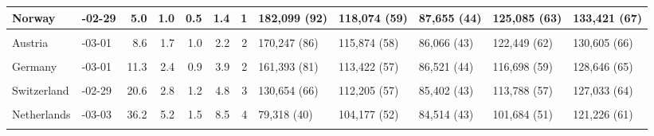 \documentclass[
]{article}
\begin{document}
\begin{landscape}
\begin{table}[H]
{\begin{tabular}[t]{l|>{\raggedright\arraybackslash}p{5em}|r|r|r|r|r|l|l|l|l|l}
\hline
Norway & 2020-02-29 & 5.0 & 1.0 & 0.5 & 1.4 & 1 & 182,099 (92) & 118,074 (59) & 87,655 (44) & 125,085 (63) & 133,421 (67)\\
\hline
\cellcolor{gray!6}{Finland} & \cellcolor{gray!6}{2020-03-02} & \cellcolor{gray!6}{6.1} & \cellcolor{gray!6}{1.4} & \cellcolor{gray!6}{0.3} & \cellcolor{gray!6}{2.4} & \cellcolor{gray!6}{1} & \cellcolor{gray!6}{178,373 (90)} & \cellcolor{gray!6}{116,698 (59)} & \cellcolor{gray!6}{88,432 (45)} & \cellcolor{gray!6}{121,723 (61)} & \cellcolor{gray!6}{133,734 (67)}\\
\hline
Austria & 2020-03-01 & 8.6 & 1.7 & 1.0 & 2.2 & 2 & 170,247 (86) & 115,874 (58) & 86,066 (43) & 122,449 (62) & 130,605 (66)\\
\hline
\cellcolor{gray!6}{Denmark} & \cellcolor{gray!6}{2020-03-04} & \cellcolor{gray!6}{10.9} & \cellcolor{gray!6}{2.1} & \cellcolor{gray!6}{0.8} & \cellcolor{gray!6}{3.0} & \cellcolor{gray!6}{2} & \cellcolor{gray!6}{162,600 (82)} & \cellcolor{gray!6}{114,438 (58)} & \cellcolor{gray!6}{86,669 (44)} & \cellcolor{gray!6}{119,850 (60)} & \cellcolor{gray!6}{130,596 (66)}\\
\hline
Germany & 2020-03-01 & 11.3 & 2.4 & 0.9 & 3.9 & 2 & 161,393 (81) & 113,422 (57) & 86,521 (44) & 116,698 (59) & 128,646 (65)\\
\hline
\cellcolor{gray!6}{Israel} & \cellcolor{gray!6}{2020-03-02} & \cellcolor{gray!6}{14.0} & \cellcolor{gray!6}{11.2} & \cellcolor{gray!6}{10.6} & \cellcolor{gray!6}{11.5} & \cellcolor{gray!6}{11} & \cellcolor{gray!6}{152,393 (77)} & \cellcolor{gray!6}{84,676 (43)} & \cellcolor{gray!6}{54,529 (27)} & \cellcolor{gray!6}{91,763 (46)} & \cellcolor{gray!6}{100,202 (50)}\\
\hline
Switzerland & 2020-02-29 & 20.6 & 2.8 & 1.2 & 4.8 & 3 & 130,654 (66) & 112,205 (57) & 85,402 (43) & 113,788 (57) & 127,033 (64)\\
\hline
\cellcolor{gray!6}{Canada} & \cellcolor{gray!6}{2020-03-06} & \cellcolor{gray!6}{24.6} & \cellcolor{gray!6}{12.4} & \cellcolor{gray!6}{4.0} & \cellcolor{gray!6}{14.8} & \cellcolor{gray!6}{10} & \cellcolor{gray!6}{117,622 (59)} & \cellcolor{gray!6}{80,631 (41)} & \cellcolor{gray!6}{76,235 (38)} & \cellcolor{gray!6}{81,075 (41)} & \cellcolor{gray!6}{103,539 (52)}\\
\hline
Netherlands & 2020-03-03 & 36.2 & 5.2 & 1.5 & 8.5 & 4 & 79,318 (40) & 104,177 (52) & 84,514 (43) & 101,684 (51) & 121,226 (61)\\
\hline
\cellcolor{gray!6}{France} & \cellcolor{gray!6}{2020-03-01} & \cellcolor{gray!6}{46.6} & \cellcolor{gray!6}{7.5} & \cellcolor{gray!6}{3.2} & \cellcolor{gray!6}{11.3} & \cellcolor{gray!6}{10} & \cellcolor{gray!6}{45,142 (23)} & \cellcolor{gray!6}{96,763 (49)} & \cellcolor{gray!6}{78,947 (40)} & \cellcolor{gray!6}{92,389 (47)} & \cellcolor{gray!6}{104,382 (53)}\\

\end{tabular}}
\end{table}
\end{landscape}
\end{document}

